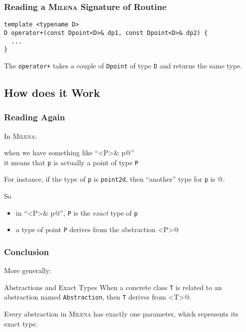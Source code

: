 \documentclass{beamer}
\newcommand{\code}[1]{{\scriptsize{\texttt{#1}}}\xspace}
\newcommand{\mln}{\textsc{Milena}\xspace}
\begin{document}
\begin{frame}[fragile]
  \frametitle{Reading a \mln Signature of Routine}

\begin{lstlisting}
template <typename D>
D operator+(const Dpoint<D>& dp1, const Dpoint<D>& dp2) {
  ...
}
\end{lstlisting}

\medskip

\begin{center}
  The \code{operator+} takes a couple of \code{Dpoint} of type
  \code{D} and returns the same type.
\end{center}

\end{frame}



\subsection{How does it Work}


\begin{frame}[fragile]
  \frametitle{Reading Again}

In \mln:
\begin{center}
  when we have something like ``\lstinline@Point<P>& p@'' \\
  it means that \code{p} is actually a point of type \code{P}
\end{center}

For instance, if the type of \code{p} is \code{point2d}, then
``another'' type for \code{p} is @.

\smallskip

So
\begin{itemize}
\item in ``\lstinline@Point<P>& p@'', \code{P} is the \emph{exact} type of \code{p}
\item a type of point \code{P} derives from the abstraction \lstinline@Point<P>@
\end{itemize}

\end{frame}


\begin{frame}[fragile]
  \frametitle{Conclusion}

More generally:

\begin{block}{Abstractions and Exact Types}
  When a concrete class \code{T} is related to an abstraction named \code{Abstraction},
  then \code{T} derives from \lstinline@Abstraction<T>@.

  \smallskip

  Every abstraction in \mln has exactly one parameter, which
  represents its exact type.
\end{block}

\end{frame}
\end{document}
